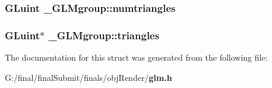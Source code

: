 \subsubsection[{numtriangles}]{\setlength{\rightskip}{0pt plus 5cm}G\-Luint \-\_\-\-G\-L\-Mgroup\-::numtriangles}\label{struct___g_l_mgroup_a7f5703d566fc731318d07d6a82a467f6}
\subsubsection[{triangles}]{\setlength{\rightskip}{0pt plus 5cm}G\-Luint$\ast$ \-\_\-\-G\-L\-Mgroup\-::triangles}\label{struct___g_l_mgroup_a08193e7d23bf6d32159d659380257240}


The documentation for this struct was generated from the following file\-:\begin{DoxyCompactItemize}
\item 
G\-:/final/final\-Submit/finals/obj\-Render/{\bf glm.\-h}\end{DoxyCompactItemize}
